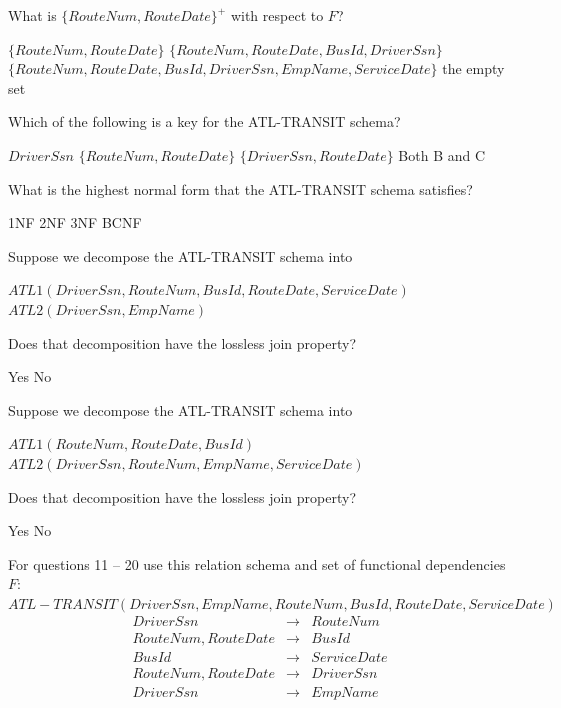 \documentclass[10pt]{exam}
\begin{document}
\begin{questions}
\question[4] What is $\{RouteNum,RouteDate\}^+$ with respect to $F$?

\begin{choices}
\choice $\{RouteNum, RouteDate\}$
\choice $\{RouteNum, RouteDate, BusId, DriverSsn\}$
\correctchoice $\{RouteNum, RouteDate, BusId, DriverSsn, EmpName, ServiceDate\}$
\choice the empty set
\end{choices}

\question[4] Which of the following is a key for the ATL-TRANSIT schema?

\begin{choices}
\choice $DriverSsn$
\choice $\{RouteNum,RouteDate\}$
\choice $\{DriverSsn,RouteDate\}$
\correctchoice Both B and C
\end{choices}

\question[4] What is the highest normal form that the ATL-TRANSIT schema satisfies?

\begin{choices}
\correctchoice 1NF
\choice 2NF
\choice 3NF
\choice BCNF
\end{choices}


\question[4] Suppose we decompose the ATL-TRANSIT schema into

$ATL1(DriverSsn, RouteNum, BusId, RouteDate, ServiceDate)$\\
$ATL2(DriverSsn, EmpName)$

Does that decomposition have the lossless join property?

\begin{choices}
  \correctchoice Yes
  \choice No
\end{choices}

\question[4] Suppose we decompose the ATL-TRANSIT schema into

$ATL1 (RouteNum, RouteDate, BusId)$\\
$ATL2 (DriverSsn, RouteNum, EmpName, ServiceDate)$

Does that decomposition have the lossless join property?

\begin{choices}
  \choice Yes
  \correctchoice No
\end{choices}

\newpage

For questions 11 -- 20 use this relation schema and set of functional dependencies $F$:\\

$ATL-TRANSIT(DriverSsn, EmpName, RouteNum, BusId, RouteDate, ServiceDate)$
\begin{eqnarray*}
  DriverSsn & \rightarrow & RouteNum\\
  RouteNum,RouteDate & \rightarrow & BusId\\
  BusId & \rightarrow & ServiceDate\\
  RouteNum,RouteDate & \rightarrow & DriverSsn\\
  DriverSsn & \rightarrow & EmpName
\end{eqnarray*}



\end{questions}
\end{document}
